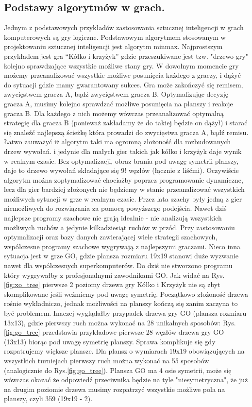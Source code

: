 \subsection{Podstawy algorytmów w grach.}
\begin{par}
Jednym z podstawowych przykładów zastosowania sztucznej inteligencji w grach komputerowych są gry logiczne. 
Podstawowym algorytmem stosowanym w projektowaniu sztucznej inteligencji jest algorytm minmax.
Najprostszym przykładem jest gra ``Kółko i krzyżyk'' gdzie przeszukiwane jest tzw. "drzewo gry" kolejno sprawdzające wszystkie możliwe stany gry. 
W dowolnym momencie gry możemy przeanalizować wszystkie możliwe posunięcia każdego z graczy, i dążyć do sytuacji gdzie mamy gwarantowany sukces.
Gra może zakończyć się remisem, zwycięstwem gracza A, bądź zwycięstwem gracza B.
Optymalizując decyzję gracza A, musimy kolejno sprawdzać możliwe posunięcia na planszy i reakcje gracza B. 
Dla każdego z nich możemy wówczas przeanalizować optymalną strategię dla gracza B (ponieważ zakładamy że do takiej będzie on dążył) i starać się znaleźć 
najlepszą ścieżkę która prowadzi do zwycięstwa gracza A, bądź remisu.
Łatwo zauważyć iż algorytm taki ma ogromną złożoność dla rozbudowanych drzew wywołań. i jedynie dla małych gier takich jak kółko i krzyżyk daje wynik w realnym czasie.
Bez optymalizacji, obraz brania pod uwagę symetrii planszy, daje to drzewo wywołań składające się 9! węzłów (łącznie z liśćmi). 
Oczywiście algorytm można zoptymalizować chociażby poprzez programowanie dynamiczne, lecz dla gier bardziej złożonych nie będziemy w stanie przeanalizować wszystkich możliwych sytuacji w grze w realnym czasie.
Przez lata szachy były jedną z gier niemożliwych do rozwiązania za pomocą powyższego podejścia.
Nawet dziś najlepsze programy szachowe nie grają idealnie - nie analizują wszystkich możliwych ruchów a jedynie kilkadziesiąt ruchów w przód.
Przy zastosowaniu optymalizacji oraz bazy danych zawierającej wiele strategii szachowych, współczesne programy szachowe wygrywają z najlepszymi graczami.
Nieco inna sytuacja jest w grze GO, gdzie plansza rozmiaru 19x19 stanowi duże wyzwanie nawet dla współczesnych superkomputerów. 
Do dziś nie stworzono programu który wygrywałby z profesjonalnymi zawodnikami GO.
Jak widać na Rys. \ref{fig:xo_tree} pierwsze 2 poziomy drzewa gry Kółko i Krzyżyk nie są zbyt skomplikowane jeśli weźmiemy pod uwagę symetrię.
Początkowo złożoność drzewa rośnie wykładniczo, jednak możliwości na planszy kończą się zanim zaczyna to być problemem.
Inaczej wyglądałby przypadek drzewa gry GO (plansza rozmiaru 13x13), gdzie pierwszy ruch można wykonać na 28 unikalnych sposobów: Rys. \ref{fig:go_tree} przedstawia przykładowe pierwsze 28 węzłów drzewa gry GO (13x13) biorąc pod uwagę symetrię planszy.
Sprawa komplikuje się gdy rozpatrujemy większe plansze.
Dla plansz o wymiarach 19x19 obowiązujących na wszystkich turniejach pierwszy ruch można wykonać na 55 sposobów (analogicznie do Rys.\ref{fig:go_tree}). Plansza GO ma 4 osie symetrii, może się wówczas okazać że odpowiedź przeciwnika będzie na tyle "niesymetryczna", że już na drugim
poziomie drzewa musimy rozpatrzyć wszystkie możliwe pola na planszy, czyli 359 (19x19 - 2).


\end{par}
